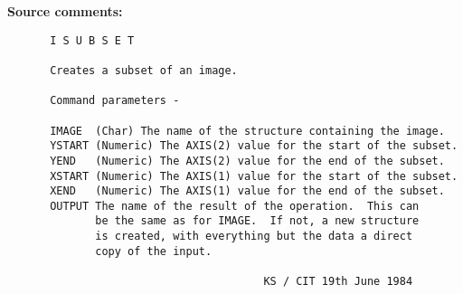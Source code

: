 \begin{description}
\item [{\bf Source comments:}]
\begin{verbatim}
 I S U B S E T

 Creates a subset of an image.

 Command parameters -

 IMAGE  (Char) The name of the structure containing the image.
 YSTART (Numeric) The AXIS(2) value for the start of the subset.
 YEND   (Numeric) The AXIS(2) value for the end of the subset.
 XSTART (Numeric) The AXIS(1) value for the start of the subset.
 XEND   (Numeric) The AXIS(1) value for the end of the subset.
 OUTPUT The name of the result of the operation.  This can
        be the same as for IMAGE.  If not, a new structure
        is created, with everything but the data a direct
        copy of the input.

                                  KS / CIT 19th June 1984
\end{verbatim}
\end{description}
